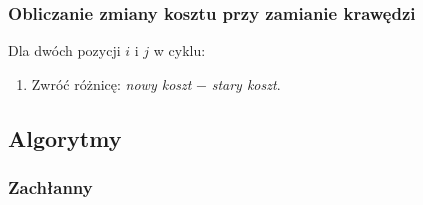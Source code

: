 \documentclass[11pt]{article}
\begin{document}
\subsubsection{Obliczanie zmiany kosztu przy zamianie krawędzi}

Dla dwóch pozycji $i$ i $j$ w cyklu:
\begin{enumerate}
    \begin{enumerate}
        \item Wyznacz wierzchołki poprzedzające i następujące po $i$ i po $j$.
        \item Oblicz sumę długości krawędzi: przed zamianą $i$ i $j$.
        \begin{enumerate}
            \item długość $i-1 -> i$ + długość $j -> j+1$
        \end{enumerate}
        \item Oblicz sumę długości po zamianie krawędzi:
        \begin{enumerate}
            \item długość $i-1 -> j-1$ + długość $i -> j$
        \end{enumerate}
    \end{enumerate}
    \item Zwróć różnicę: \textit{nowy koszt} $-$ \textit{stary koszt}.
\end{enumerate}


\subsection{Algorytmy}

\subsubsection{Zachłanny}\label{subsec:zachanny}
\end{document}
